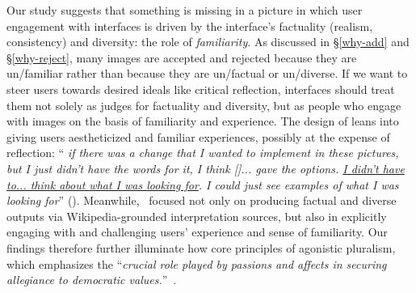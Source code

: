 Our study suggests that something is missing in a picture in which user engagement with interfaces is driven by the interface's factuality (realism, consistency) and diversity: the role of \textit{familiarity}.
As discussed in \S\ref{why-add} and \S\ref{why-reject}, many images are accepted and rejected because they are un/familiar rather than because they are un/factual or un/diverse.
If we want to steer users towards desired ideals like critical reflection, interfaces should treat them not solely as judges for factuality and diversity, but as people who engage with images on the basis of familiarity and experience.
The design of  leans into giving users aestheticized and familiar experiences, possibly at the expense of reflection:
``\textit{
if there was a change that I wanted to implement in these pictures, but I just didn’t have the words for it, I think []... gave the options. \underline{I didn’t have to... think about what I was looking for}. I could just see examples of what I was looking for}'' ().
Meanwhile, \agonistic~focused not only on producing factual and diverse outputs via Wikipedia-grounded interpretation sources, but also in explicitly engaging with and challenging users' experience and sense of familiarity.
Our findings therefore further illuminate how core principles of agonistic pluralism, which emphasizes the ``\textit{crucial role played by passions and affects in securing allegiance to democratic values.}''~\cite{mouffe2000democraticparadox}.









